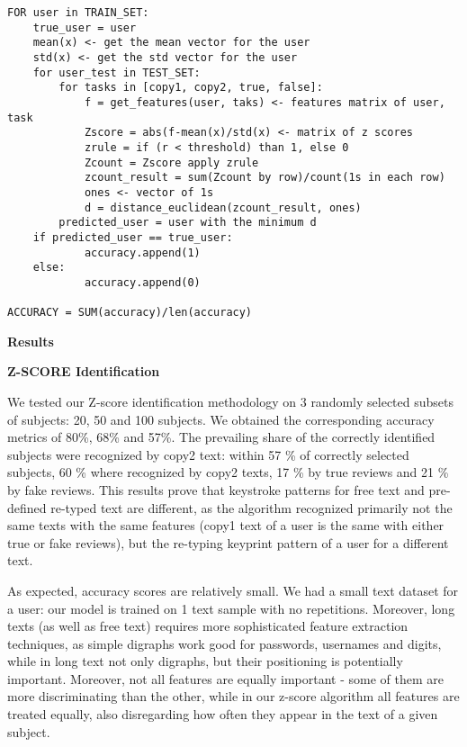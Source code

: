\documentclass[12pt,a4]{article}
\begin{document}
\begin{lstlisting}
FOR user in TRAIN_SET:
    true_user = user
    mean(x) <- get the mean vector for the user
    std(x) <- get the std vector for the user
    for user_test in TEST_SET:
        for tasks in [copy1, copy2, true, false]:
            f = get_features(user, taks) <- features matrix of user, task
            Zscore = abs(f-mean(x)/std(x) <- matrix of z scores
            zrule = if (r < threshold) than 1, else 0
            Zcount = Zscore apply zrule
            zcount_result = sum(Zcount by row)/count(1s in each row)
            ones <- vector of 1s
            d = distance_euclidean(zcount_result, ones)
        predicted_user = user with the minimum d
    if predicted_user == true_user:
            accuracy.append(1)
    else:
            accuracy.append(0)
            
ACCURACY = SUM(accuracy)/len(accuracy)

\end{lstlisting}



\bigskip
\large\textbf{Results}
\bigskip

\medskip
\small\textbf{Z-SCORE Identification}
\medskip

\normalsize

We tested our Z-score identification methodology on 3 randomly selected subsets of subjects: 20, 50 and 100 subjects. We obtained the corresponding accuracy metrics of 80\%, 68\% and 57\%. The prevailing share of the correctly identified subjects were recognized by copy2 text: within 57 \% of correctly selected subjects, 60 \% where recognized by copy2 texts, 17 \% by true reviews and 21 \% by fake reviews. This results prove that keystroke patterns for free text and pre-defined re-typed text are different, as the algorithm recognized primarily not the same texts with the same features (copy1 text of a user is the same with either true or fake reviews), but the re-typing keyprint pattern of a user for a different text.

As expected, accuracy scores are relatively small. We had a small text dataset for a user: our model is trained on 1 text sample with no repetitions. Moreover, long texts (as well as free text) requires more sophisticated feature extraction techniques, as simple digraphs work good for passwords, usernames and digits, while in long text not only digraphs, but their positioning is potentially important. Moreover, not all features are equally important - some of them are more discriminating than the other, while in our z-score algorithm all features are treated equally, also disregarding how often they appear in the text of a given subject.





{}

\end{document}
